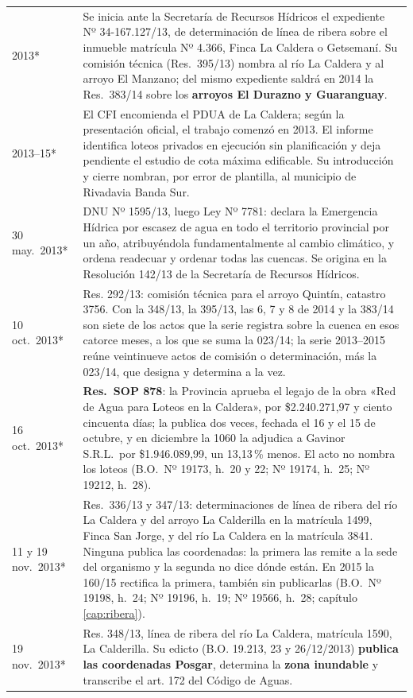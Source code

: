 \begin{longtable}{@{}p{2.7cm}p{10.3cm}@{}}
2013* & Se inicia ante la Secretaría de Recursos Hídricos el expediente Nº 34-167.127/13, de determinación de línea de ribera sobre el inmueble matrícula Nº 4.366, Finca La Caldera o Getsemaní. Su comisión técnica (Res.\ 395/13) nombra al río La Caldera y al arroyo El Manzano; del mismo expediente saldrá en 2014 la Res.\ 383/14 sobre los \textbf{arroyos El Durazno y Guaranguay}. \\
2013--15* & El CFI encomienda el PDUA de La Caldera; según la presentación oficial, el trabajo comenzó en 2013. El informe identifica loteos privados en ejecución sin planificación y deja pendiente el estudio de cota máxima edificable. Su introducción y cierre nombran, por error de plantilla, al municipio de Rivadavia Banda Sur. \\
30 may.\ 2013* & DNU Nº 1595/13, luego Ley Nº 7781: declara la Emergencia Hídrica por escasez de agua en todo el territorio provincial por un año, atribuyéndola fundamentalmente al cambio climático, y ordena readecuar y ordenar todas las cuencas. Se origina en la Resolución 142/13 de la Secretaría de Recursos Hídricos. \\
10 oct.\ 2013* & Res. 292/13: comisión técnica para el arroyo Quintín, catastro 3756. Con la 348/13, la 395/13, las 6, 7 y 8 de 2014 y la 383/14 son siete de los actos que la serie registra sobre la cuenca en esos catorce meses, a los que se suma la 023/14; la serie 2013--2015 reúne veintinueve actos de comisión o determinación, más la 023/14, que designa y determina a la vez. \\
16 oct.\ 2013* & \textbf{Res.\ SOP 878}: la Provincia aprueba el legajo de la obra «Red de Agua para Loteos en la Caldera», por \$2.240.271,97 y ciento cincuenta días; la publica dos veces, fechada el 16 y el 15 de octubre, y en diciembre la 1060 la adjudica a Gavinor S.R.L.\ por \$1.946.089,99, un 13,13\,\% menos. El acto no nombra los loteos (B.O.\ Nº 19173, h.\ 20 y 22; Nº 19174, h.\ 25; Nº 19212, h.\ 28). \\
11 y 19 nov.\ 2013* & Res.\ 336/13 y 347/13: determinaciones de línea de ribera del río La Caldera y del arroyo La Calderilla en la matrícula 1499, Finca San Jorge, y del río La Caldera en la matrícula 3841. Ninguna publica las coordenadas: la primera las remite a la sede del organismo y la segunda no dice dónde están. En 2015 la 160/15 rectifica la primera, también sin publicarlas (B.O.\ Nº 19198, h.\ 24; Nº 19196, h.\ 19; Nº 19566, h.\ 28; capítulo \ref{cap:ribera}). \\
19 nov.\ 2013* & Res. 348/13, línea de ribera del río La Caldera, matrícula 1590, La Calderilla. Su edicto (B.O. 19.213, 23 y 26/12/2013) \textbf{publica las coordenadas Posgar}, determina la \textbf{zona inundable} y transcribe el art. 172 del Código de Aguas. \\

\end{longtable}
